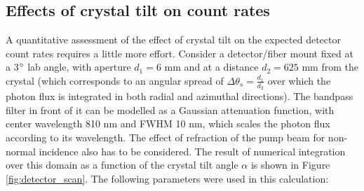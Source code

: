 \documentclass[a4paper,
DIV=13,
12pt,
BCOR=10mm,
department=FakEI,
twoside,
parskip=half,
automark,
logostyle=flat,
]{OTHRartcl}
\begin{document}
\subsection{Effects of crystal tilt on count rates}

A quantitative assessment of the effect of crystal tilt on the expected detector count rates requires a little more effort. Consider a detector/fiber mount fixed at a 3$\degree$ lab angle, with aperture $d_1 = 6$ mm and at a distance $d_2 = 625$ mm from the crystal (which corresponds to an angular spread of $\Delta \theta_s = \frac{d_1}{d_2}$ over which the photon flux is integrated in both radial and azimuthal directions). The bandpass filter in front of it can be modelled as a Gaussian attenuation function, with center wavelength 810 nm and FWHM 10 nm, which scales the photon flux according to its wavelength. The effect of refraction of the pump beam for non-normal incidence also has to be considered. The result of numerical integration over this domain as a function of the crystal tilt angle $\alpha$ is shown in Figure \ref{fig:detector_scan}. The following parameters were used in this calculation:
\end{document}
